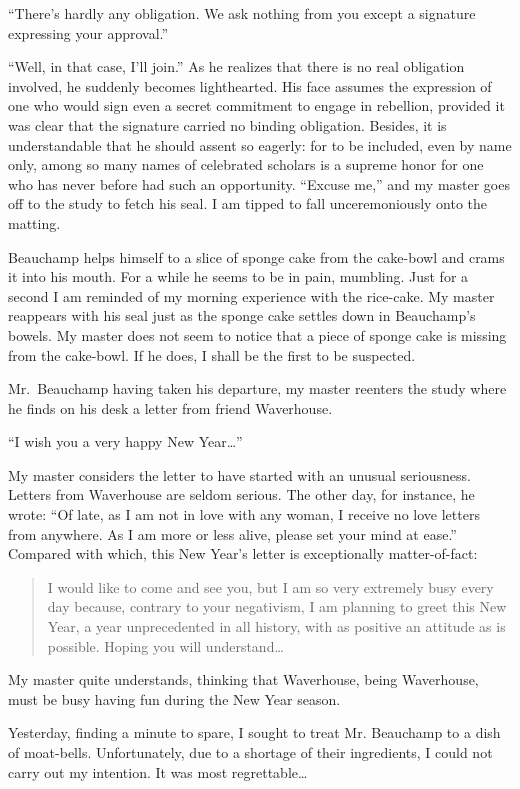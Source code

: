 \documentclass[12pt, openright]{book}
\begin{document}
``There's hardly any obligation. We ask nothing from you except a
signature expressing your approval.''

``Well, in that case, I'll join.'' As he realizes that there is no real
obligation involved, he suddenly becomes lighthearted. His face assumes
the expression of one who would sign even a secret commitment to engage
in rebellion, provided it was clear that the signature carried no
binding obligation. Besides, it is understandable that he should assent
so eagerly: for to be included, even by name only, among so many names
of celebrated scholars is a supreme honor for one who has never before
had such an opportunity. ``Excuse me,'' and my master goes off to the
study to fetch his seal. I am tipped to fall unceremoniously onto the
matting.

Beauchamp helps himself to a slice of sponge cake from the cake-bowl and
crams it into his mouth. For a while he seems to be in pain, mumbling.
Just for a second I am reminded of my morning experience with the
rice-cake. My master reappears with his seal just as the sponge cake
settles down in Beauchamp's bowels. My master does not seem to notice
that a piece of sponge cake is missing from the cake-bowl. If he does, I
shall be the first to be suspected.

Mr.~Beauchamp having taken his departure, my master reenters the study
where he finds on his desk a letter from friend Waverhouse.

``I wish you a very happy New Year\ldots{}''

My master considers the letter to have started with an unusual
seriousness. Letters from Waverhouse are seldom serious. The other day,
for instance, he wrote: ``Of late, as I am not in love with any woman, I
receive no love letters from anywhere. As I am more or less alive,
please set your mind at ease.'' Compared with which, this New Year's
letter is exceptionally matter-of-fact:

\blockquote{I would like to come and see you, but I am so very extremely busy every
day because, contrary to your negativism, I am planning to greet this
New Year, a year unprecedented in all history, with as positive an
attitude as is possible. Hoping you will understand\ldots{}}

My master quite understands, thinking that Waverhouse, being Waverhouse,
must be busy having fun during the New Year season.

Yesterday, finding a minute to spare, I sought to treat Mr. Beauchamp to
a dish of moat-bells. Unfortunately, due to a shortage of their
ingredients, I could not carry out my intention. It was most
regrettable\ldots{}
\end{document}
